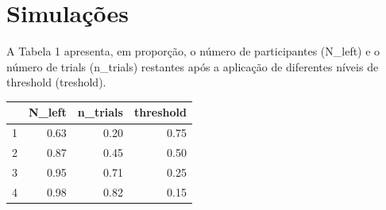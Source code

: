\documentclass{article}
\begin{document}
\section{Simulações}

A Tabela 1 apresenta, em proporção, o número de participantes (N\_left) e o número de trials (n\_trials) restantes após a aplicação de diferentes níveis de threshold (treshold).

\begin{table}[ht]
\centering
\begin{tabular}{rrrr}
  \hline
 & N\_left & n\_trials & threshold \\
  \hline
1 & 0.63 & 0.20 & 0.75 \\
  2 & 0.87 & 0.45 & 0.50 \\
  3 & 0.95 & 0.71 & 0.25 \\
  4 & 0.98 & 0.82 & 0.15 \\
   \hline
\end{tabular}
\end{table}
\end{document}
